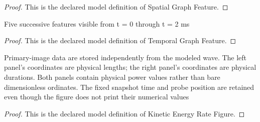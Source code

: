\begin{proof}
  This is the declared model definition of Spatial Graph Feature.
\end{proof}
\begin{definition}
  \label{def:physics:phyx-mini-0293:phyxminiproblems-problemphyxmini0293-temporalgraphfeature}
  Five successive features visible from t = 0 through t = 2 ms
\end{definition}
\begin{proof}
  This is the declared model definition of Temporal Graph Feature.
\end{proof}
\begin{definition}
  \label{def:physics:phyx-mini-0293:phyxminiproblems-problemphyxmini0293-kineticenergyratefigure}
  Primary-image data are stored independently from the modeled wave. The left panel's coordinates are physical lengths; the right panel's coordinates are physical durations. Both panels contain physical power values rather than bare dimensionless ordinates. The fixed snapshot time and probe position are retained even though the figure does not print their numerical values
\end{definition}
\begin{proof}
  This is the declared model definition of Kinetic Energy Rate Figure.
\end{proof}
